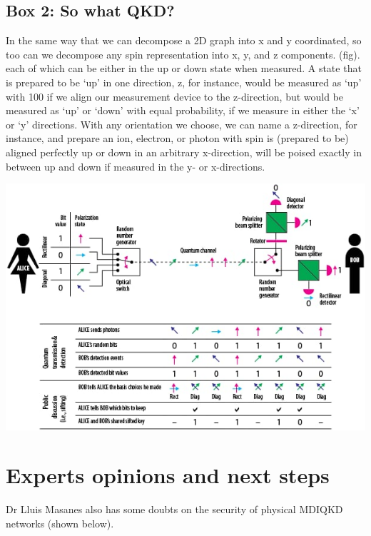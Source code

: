 \documentclass[journal]{vgtc}
\begin{document}
\begin{tcolorbox}
\section{Box 2: So what QKD?}

In the same way that we can decompose a 2D graph into
x and y coordinated, so too can we decompose any spin
representation into x, y, and z components. (fig). each of
which can be either in the up or down state when
measured.
A state that is prepared to be ‘up’ in one direction, z, for
instance, would be measured as ‘up’ with 100%
if we align our measurement device to the z-direction, but
would be measured as ‘up’ or ‘down’ with equal
probability, if we measure in either the ‘x’ or ‘y’ directions.
With any orientation we choose, we can name a
z-direction, for instance, and prepare an ion, electron, or
photon with spin is (prepared to be) aligned perfectly up
or down in an arbitrary x-direction, will be poised exactly in
between up and down if measured in the y- or x-directions.

\includegraphics[width=\linewidth]{Box_2}

\end{tcolorbox}


\section{Experts opinions and next steps}


Dr Lluis Masanes also has some doubts on the security of physical MDIQKD networks (shown below). 

\vspace{0.3cm}
\end{document}
